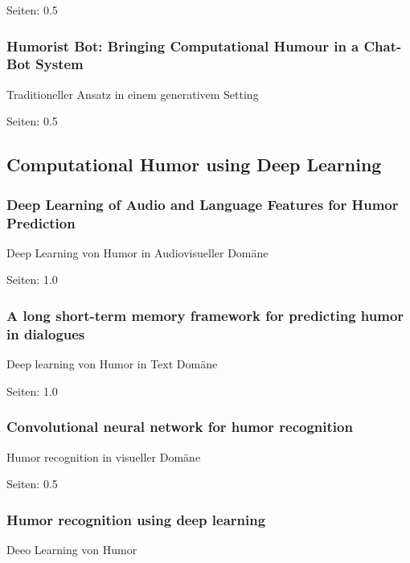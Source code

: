 \documentclass[draft,final,oneside]{vutinfth} %
\begin{document}
\cite{Bamman2015ContextualizedSD}

Seiten: 0.5

\subsubsection{Humorist Bot: Bringing Computational Humour in a Chat-Bot System}

Traditioneller Ansatz in einem generativem Setting

\cite{HumoristBot}

Seiten: 0.5

\subsection{Computational Humor using Deep Learning}

\subsubsection{Deep Learning of Audio and Language Features for Humor Prediction}

Deep Learning von Humor in Audiovisueller Domäne

Seiten: 1.0

\cite{Bertero2016DeepLO}

\subsubsection{A long short-term memory framework for predicting humor in dialogues}

Deep learning von Humor in Text Domäne

\cite{bertero2016long}

Seiten: 1.0

\subsubsection{Convolutional neural network for humor recognition}

Humor recognition in visueller Domäne

\cite{chen2017convolutional}

Seiten: 0.5

\subsubsection{Humor recognition using deep learning}

Deeo Learning von Humor 
\end{document}
